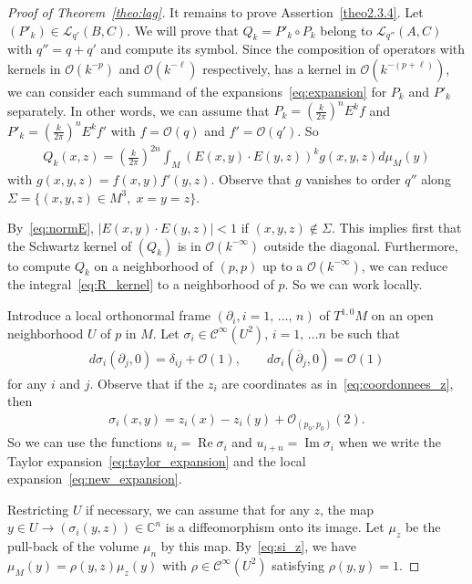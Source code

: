 \documentclass[10pt,a4paper]{article}
\theoremstyle{definition}
\numberwithin{equation}{section}
\newcommand{\C}{{\mathbb{C}}}
\newcommand{\si}{{\sigma}}
\newcommand{\Si}{{\Sigma}}
\newcommand{\con}{\overline}
\newcommand{\op}{\operatorname}
\newcommand{\Ci}{{\mathcal{C}}^{\infty}}
\newcommand{\bigo}{\mathcal{O}}
\newcommand{\lag}{\mathcal{L}}
\begin{document}
\begin{proof}[Proof of Theorem~\ref{theo:lag}]
It remains to prove Assertion~\eqref{theo2.3.4}. Let $(P'_k) \in
\lag_{q'} (B,C)$. We will prove that $Q_k = P'_k \circ P_k$ belong to $\lag _{q'' } (A,C)$ with $q'' = q + q'$ and compute its symbol. Since the composition of operators with kernels in $\bigo (k^{-p})$ and $\bigo (k^{-\ell})$ respectively, has a kernel in $\bigo (k^{-(p+\ell)})$, we can consider each summand of the expansions~\eqref{eq:expansion} for $P_k$ and $P'_k$ separately. In other words, we can assume that $P_k = (\frac{k}{2\pi} )^n E^k f$ and $P'_k = (\frac{k}{2\pi})^n E^k f'$ with $f = \bigo (q)$ and $f' = \bigo (q')$. So
\begin{gather}\label{eq:R_kernel}
Q_k (x,z) = \left(\frac{k}{2\pi} \right)^{2n} \int_M (E(x,y) \cdot E(y,z))^k g(x,y,z) d \mu_M (y)
\end{gather}
with $g(x,y,z) = f(x,y) f' (y,z)$. Observe that $g$ vanishes to order $q''$ along $\Si = \{ (x,y,z) \in M^3, \; x= y = z \}$.



By~\eqref{eq:normE}, $|E(x,y) \cdot E(y,z) | < 1 $ if $(x,y,z) \notin \Si$. This implies first that the Schwartz kernel of $(Q_k)$ is in $\bigo (k^{-\infty})$ outside the diagonal. Furthermore, to compute $Q_k$ on a neighborhood of $(p,p)$ up to a $\bigo (k^{-\infty})$, we can reduce the integral~\eqref{eq:R_kernel} to a neighborhood of $p$. So we can work locally.

Introduce a local orthonormal frame $(\partial_i, i =1,\, \ldots,\, n)$ of $T^{1,0}M$ on an open neighborhood $U$ of $p$ in $M$. Let $\si_i \in \Ci (U^2)$, $i =1,\,\ldots n$ be such that
\begin{gather}\label{eq:dsi_i--partial_j}
d\si_i (\partial_j, 0) = \delta_{ij} + \bigo (1), \qquad d\si_i \left(\con{\partial}_j, 0\right) = \bigo (1)
\end{gather}
for any $i$ and $j$. Observe that if the $z_i$ are coordinates as in~\eqref{eq:coordonnees_z}, then
\begin{gather}\label{eq:si_z}
\si_i (x,y) = z_i(x) - z_i (y) + \bigo_{(p_0, p_0)} (2).
\end{gather}
So we can use the functions $u_i = \op{Re} \si _i$ and $u_{i+n} = \op{Im} \si_i$ when we write the Taylor expansion~\eqref{eq:taylor_expansion} and the local expansion~\eqref{eq:new_expansion}.



Restricting $U$ if necessary, we can assume that for any $z$, the map $ y\in U \rightarrow (\si_i (y,z)) \in \C^n$ is a diffeomorphism onto its image. Let $\mu_z$ be the pull-back of the volume $\mu_n $ by this map. By~\eqref{eq:si_z}, we have $\mu_M (y) = \rho (y,z) \mu_z (y)$ with $\rho \in \Ci (U^2)$ satisfying $\rho (y,y) = 1$.


\end{proof}
\end{document}

